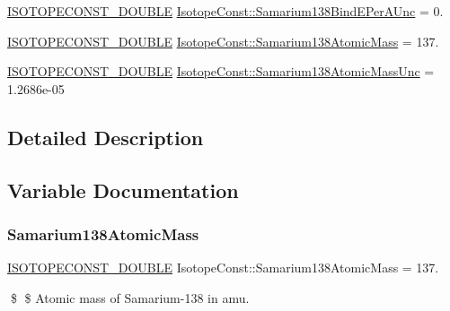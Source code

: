 \begin{DoxyCompactItemize}
\mbox{\hyperlink{group___isotope_const-_macros_ga8f45a7272ce02c0b4c65c44636ed719a}{I\+S\+O\+T\+O\+P\+E\+C\+O\+N\+S\+T\+\_\+\+D\+O\+U\+B\+LE}} \mbox{\hyperlink{group___isotope_const-_samarium-_sm138_ga8b39428e30a391408bf910221767ca85}{Isotope\+Const\+::\+Samarium138\+Bind\+E\+Per\+A\+Unc}} = 0.
\item 
\mbox{\hyperlink{group___isotope_const-_macros_ga8f45a7272ce02c0b4c65c44636ed719a}{I\+S\+O\+T\+O\+P\+E\+C\+O\+N\+S\+T\+\_\+\+D\+O\+U\+B\+LE}} \mbox{\hyperlink{group___isotope_const-_samarium-_sm138_gaec28910b597186c18d7775f6bd6977f2}{Isotope\+Const\+::\+Samarium138\+Atomic\+Mass}} = 137.
\item 
\mbox{\hyperlink{group___isotope_const-_macros_ga8f45a7272ce02c0b4c65c44636ed719a}{I\+S\+O\+T\+O\+P\+E\+C\+O\+N\+S\+T\+\_\+\+D\+O\+U\+B\+LE}} \mbox{\hyperlink{group___isotope_const-_samarium-_sm138_ga92a0af2b25ba0d63028aeac44863a8a8}{Isotope\+Const\+::\+Samarium138\+Atomic\+Mass\+Unc}} = 1.\+2686e-\/05
\end{DoxyCompactItemize}


\subsection{Detailed Description}


\subsection{Variable Documentation}
\mbox{\label{group___isotope_const-_samarium-_sm138_gaec28910b597186c18d7775f6bd6977f2}} 
\subsubsection{\texorpdfstring{Samarium138\+Atomic\+Mass}{Samarium138AtomicMass}}
{\footnotesize\ttfamily \mbox{\hyperlink{group___isotope_const-_macros_ga8f45a7272ce02c0b4c65c44636ed719a}{I\+S\+O\+T\+O\+P\+E\+C\+O\+N\+S\+T\+\_\+\+D\+O\+U\+B\+LE}} Isotope\+Const\+::\+Samarium138\+Atomic\+Mass = 137.}

\$ \$ Atomic mass of Samarium-\/138 in amu. \mbox{\label{group___isotope_const-_samarium-_sm138_ga92a0af2b25ba0d63028aeac44863a8a8}} 

